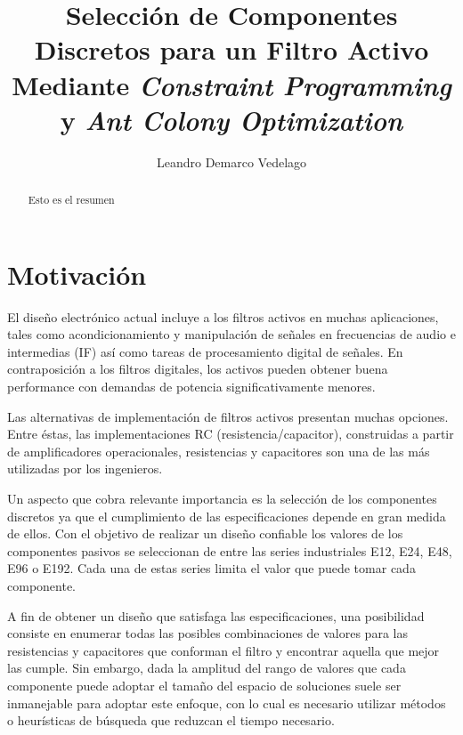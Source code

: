 \documentclass{llncs}
\title{Selección de Componentes Discretos para un Filtro Activo Mediante
  \textit{Constraint Programming} y \textit{Ant Colony Optimization}}
\author{Leandro Demarco Vedelago}
\institute{
            \email{leandrodemarco@gmail.com}\\
            Universidad Nacional de Córdoba, Fa.M.A.F
          }
\begin{document}
{\def\addcontentsline#1#2#3{}\maketitle
  \noindent
  }
  
\begin{abstract}
  Esto es el resumen 
\end{abstract}

\tableofcontents
\newpage
  \section{\textbf{Motivación}}
    \label{sec:motivacion}
    El dise\~no electrónico actual incluye a los filtros activos en muchas aplicaciones,
    tales como acondicionamiento y manipulación de se\~nales en frecuencias de audio e
    intermedias (IF) así como tareas de procesamiento digital de se\~nales. En
    contraposición a los filtros digitales, los activos pueden obtener buena performance
    con demandas de potencia significativamente menores.
    
    Las alternativas de implementación de filtros activos presentan muchas opciones.
    Entre éstas, las implementaciones RC (resistencia/capacitor), construidas a partir de
    amplificadores operacionales, resistencias y capacitores son una de las más utilizadas
    por los ingenieros.\cite{corr}
    
    Un aspecto que cobra relevante importancia es la selección de los componentes discretos
    ya que el cumplimiento de las especificaciones depende en gran medida de ellos. Con el
    objetivo de realizar un diseño confiable los valores de los componentes pasivos se
    seleccionan de entre las series industriales E12, E24, E48, E96 o E192. Cada una de estas
    series limita el valor que puede tomar cada componente.
    
    A fin de obtener un diseño que satisfaga las especificaciones,  una posibilidad consiste 
    en enumerar todas las posibles combinaciones de valores para las resistencias y 
    capacitores que conforman el filtro y encontrar aquella que mejor las cumple. Sin embargo,
    dada la amplitud del rango de valores que cada componente puede adoptar el tamaño del
    espacio de soluciones suele ser inmanejable para adoptar este enfoque, con
    lo cual es necesario utilizar métodos o heurísticas de búsqueda que reduzcan el tiempo
    necesario.
    
\end{document}
